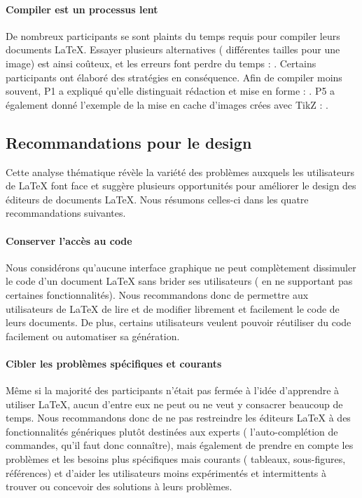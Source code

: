 \paragraph{Compiler est un processus lent}
De nombreux participants se sont plaints du temps requis pour compiler leurs documents \LaTeX{}.
Essayer plusieurs alternatives (\eg{} différentes tailles pour une image) est ainsi coûteux, et les erreurs font perdre du temps : .
Certains participants ont élaboré des stratégies en conséquence.
Afin de compiler moins souvent, P1 a expliqué qu'elle distinguait rédaction et mise en forme : .
P5 a également donné l'exemple de la mise en cache d'images crées avec TikZ : .

\subsection{Recommandations pour le design}
Cette analyse thématique révèle la variété des problèmes auxquels les utilisateurs de \LaTeX{} font face et suggère plusieurs opportunités pour améliorer le design des éditeurs de documents \LaTeX{}. Nous résumons celles-ci dans les quatre recommandations suivantes.

\paragraph{Conserver l'accès au code}
Nous considérons qu'aucune interface graphique ne peut complètement dissimuler le code d'un document \LaTeX{} sans brider ses utilisateurs (\eg{} en ne supportant pas certaines fonctionnalités). 
Nous recommandons donc de permettre aux utilisateurs de \LaTeX{} de lire et de modifier librement et facilement le code de leurs documents.
De plus, certains utilisateurs veulent pouvoir réutiliser du code facilement ou automatiser sa génération.

\paragraph{Cibler les problèmes spécifiques et courants}
Même si la majorité des participants n'était pas fermée à l'idée d'apprendre à utiliser \LaTeX{}, aucun d'entre eux ne peut ou ne veut y consacrer beaucoup de temps.
Nous recommandons donc de ne pas restreindre les éditeurs \LaTeX{} à des fonctionnalités génériques plutôt destinées aux experts (\eg{} l'auto-complétion de commandes, qu'il faut donc connaître), mais également de prendre en compte les problèmes et les besoins plus spécifiques mais courants (\eg{} tableaux, sous-figures, références) et d'aider les utilisateurs moins expérimentés et intermittents à trouver ou concevoir des solutions à leurs problèmes.

